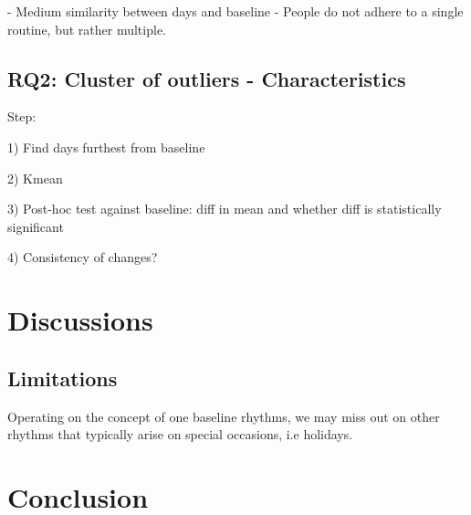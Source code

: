 \documentclass[pdflatex,sn-vancouver,Numbered]{bst/sn-jnl}%
\theoremstyle{thmstyleone}%
\theoremstyle{thmstyletwo}%
\theoremstyle{thmstylethree}%
\begin{document}
- Medium similarity between days and baseline - People do not adhere to a single routine, but rather multiple.

\subsection*{RQ2: Cluster of outliers - Characteristics}

Step:

1) Find days furthest from baseline 

2) Kmean

3) Post-hoc test against baseline: diff in mean and whether diff is statistically significant

4) Consistency of changes?

\section*{Discussions}\label{sec4}  

\subsection{Limitations}\label{sec4.2}  
Operating on the concept of one baseline rhythms, we may miss out on other rhythms that typically arise on special occasions, i.e holidays.

\section*{Conclusion}\label{sec5}  
\end{document}
